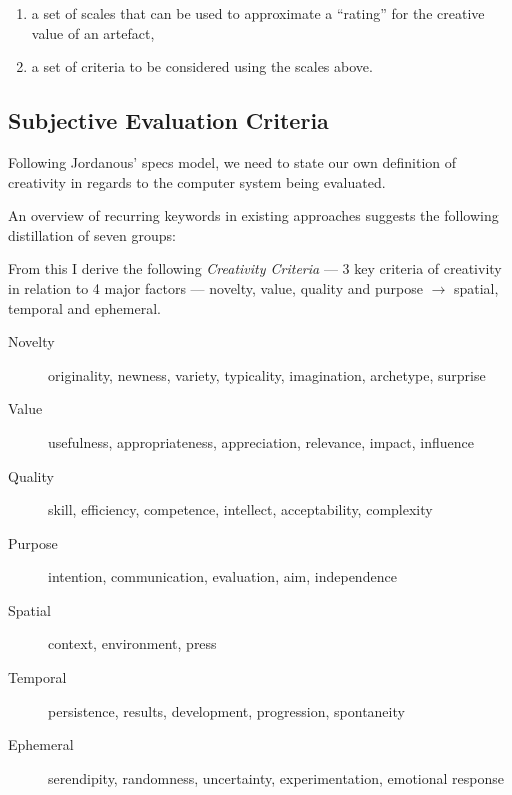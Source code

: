 \begin{enumerate}
  \item a set of scales that can be used to approximate a ``rating'' for the creative value of an artefact,
  \item a set of criteria to be considered using the scales above.
\end{enumerate}


\subsection{Subjective Evaluation Criteria}

Following Jordanous' \gls{specs} model, we need to state our own definition of creativity in regards to the computer system being evaluated.

An overview of recurring keywords in existing approaches suggests the following distillation of seven groups:

From this I derive the following \hypertarget{creadef}{\textit{Creativity Criteria}} --- 3 key criteria of creativity in relation to 4 major factors --- novelty, value, quality and purpose $\to$ spatial, temporal and ephemeral.

\begin{description}
  \item [Novelty] originality, newness, variety, typicality, imagination, archetype, surprise
  \item [Value] usefulness, appropriateness, appreciation, relevance, impact, influence
  \item [Quality] skill, efficiency, competence, intellect, acceptability, complexity
  \item [Purpose] intention, communication, evaluation, aim, independence
  \item [Spatial] context, environment, press
  \item [Temporal] persistence, results, development, progression, spontaneity
  \item [Ephemeral] serendipity, randomness, uncertainty, experimentation, emotional response
\end{description}


